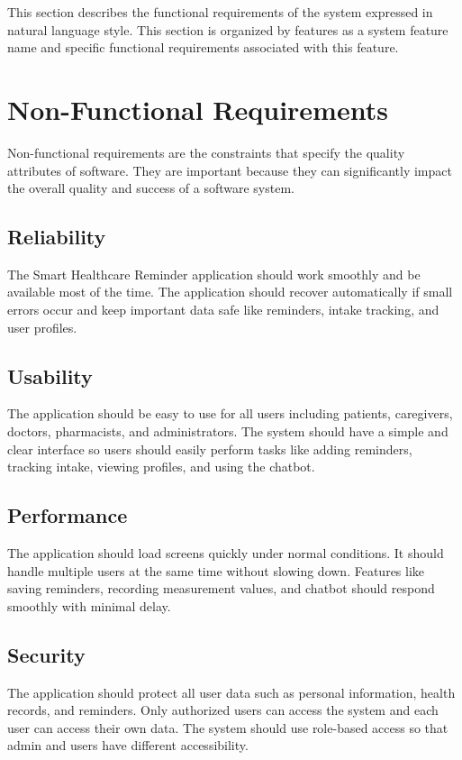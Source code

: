 This section describes the functional requirements of the system expressed in natural language style. This section is organized by features as a system feature name and specific functional requirements associated with this feature.



\section{Non-Functional Requirements}
\label{sec:non-functional-req}

Non-functional requirements are the constraints that specify the quality attributes of software. They are important because they can significantly impact the overall quality and success of a software system.

\subsection{Reliability}
The Smart Healthcare Reminder application should work smoothly and be available most of the time. The application should recover automatically if small errors occur and keep important data safe like reminders, intake tracking, and user profiles.

\subsection{Usability}
The application should be easy to use for all users including patients, caregivers, doctors, pharmacists, and administrators. The system should have a simple and clear interface so users should easily perform tasks like adding reminders, tracking intake, viewing profiles, and using the chatbot.

\subsection{Performance}
The application should load screens quickly under normal conditions. It should handle multiple users at the same time without slowing down. Features like saving reminders, recording measurement values, and chatbot should respond smoothly with minimal delay.

\subsection{Security}
The application should protect all user data such as personal information, health records, and reminders. Only authorized users can access the system and each user can access their own data. The system should use role-based access so that admin and users have different accessibility.

